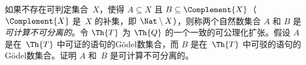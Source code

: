 \documentclass[../../../include/open-logic-section]{subfiles}
\begin{document}
\begin{prob}
如果不存在可判定集合~$X$，使得 $A \subseteq X$ 且 $B \subseteq \Complement{X}$（$\Complement{X}$ 是~$X$ 的补集，即 $\Nat \setminus X$），则称两个自然数集合 $A$ 和 $B$ 是\emph{可计算不可分离的}。令 $\Th{T}$ 为 $\Th{Q}$ 的一个一致的可公理化扩张。假设 $A$ 是在~$\Th{T}$ 中可证的语句的Gödel数集合，而 $B$ 是在~$\Th{T}$ 中可驳的语句的Gödel数集合。证明 $A$ 和~$B$ 是可计算不可分离的。
\end{prob}
\end{document}
